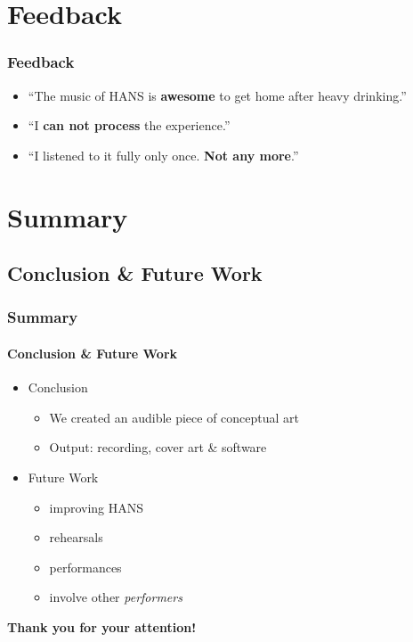\documentclass[mathserif,serif]{beamer}
\begin{document}
\section{Feedback}
\begin{frame}
\frametitle{Feedback}

\begin{itemize}
\item ``The music of HANS is \textbf{awesome} to get home after heavy drinking.''
\item ``I \textbf{can not process} the experience.''
\item ``I listened to it fully only once. \textbf{Not any more}.''
\end{itemize}
\end{frame}

\section{Summary}
\subsection{Conclusion \& Future Work}
\begin{frame}
\frametitle{Summary}
\framesubtitle{Conclusion \& Future Work}

\begin{itemize}
\item Conclusion
\begin{itemize}
\item We created an audible piece of conceptual art
\item Output: recording, cover art \& software
\end{itemize}
\item Future Work
\begin{itemize}
\item improving HANS
\item rehearsals
\item performances
\item involve other \textit{performers}
\end{itemize}
\end{itemize}

\vfill
\begin{center}
\LARGE \textbf{Thank you for your attention!}
\end{center}

\end{frame}
\end{document}
